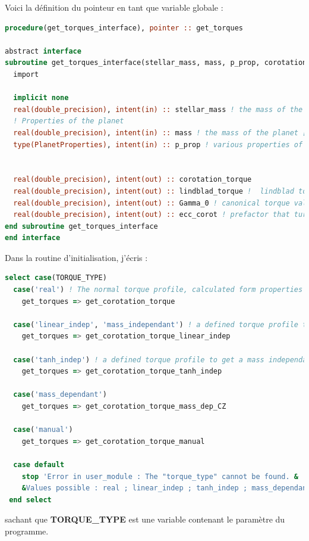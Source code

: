 \documentclass[a4paper,twoside]{article}
\begin{document}
Voici la définition du pointeur en tant que variable globale : 
\begin{lstlisting}[language=Fortran]
procedure(get_torques_interface), pointer :: get_torques

abstract interface 
subroutine get_torques_interface(stellar_mass, mass, p_prop, corotation_torque, lindblad_torque, Gamma_0, ecc_corot)
  import 
  
  implicit none
  real(double_precision), intent(in) :: stellar_mass ! the mass of the central body [Msun * K2]
  ! Properties of the planet
  real(double_precision), intent(in) :: mass ! the mass of the planet [Msun * K2]
  type(PlanetProperties), intent(in) :: p_prop ! various properties of the planet
  
  
  real(double_precision), intent(out) :: corotation_torque
  real(double_precision), intent(out) :: lindblad_torque !  lindblad torque exerted by the disk on the planet [\Gamma_0]
  real(double_precision), intent(out) :: Gamma_0 ! canonical torque value [Ms.AU^2](equation (8) of Paardekooper, Baruteau, 2009)
  real(double_precision), intent(out) :: ecc_corot ! prefactor that turns out the corotation torque if the eccentricity is too high (Bitsch & Kley, 2010)
end subroutine get_torques_interface
end interface
\end{lstlisting}

Dans la routine d'initialisation, j'écris : 
\begin{lstlisting}[language=Fortran]
select case(TORQUE_TYPE)
  case('real') ! The normal torque profile, calculated form properties of the disk
    get_torques => get_corotation_torque
  
  case('linear_indep', 'mass_independant') ! a defined torque profile to get a mass independant convergence zone
    get_torques => get_corotation_torque_linear_indep
  
  case('tanh_indep') ! a defined torque profile to get a mass independant convergence zone
    get_torques => get_corotation_torque_tanh_indep
  
  case('mass_dependant')
    get_torques => get_corotation_torque_mass_dep_CZ
    
  case('manual')
    get_torques => get_corotation_torque_manual
    
  case default
    stop 'Error in user_module : The "torque_type" cannot be found. &
    &Values possible : real ; linear_indep ; tanh_indep ; mass_dependant ; manual'
 end select
\end{lstlisting}
sachant que \textbf{TORQUE\_TYPE} est une variable contenant le paramètre du programme.
\end{document}
